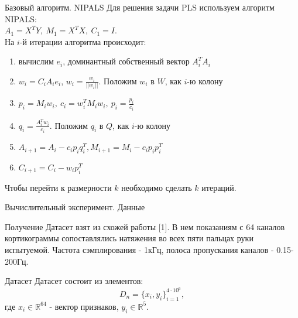 \documentclass{beamer}
\begin{document}
\begin{frame}{Базовый алгоритм. NIPALS}
Для решения задачи PLS используем алгоритм NIPALS:\\
$A_1 = X^TY,\ M_1 = X^TX,\ C_1 = I$.\\ На $i$-й итерации алгоритма происходит:
\begin{enumerate}
    \item вычислим $e_i$, доминантный собственный вектор $A_i^TA_i$
    \item $w_i = C_i A_i e_i$, $w_i = \frac{w_i}{||w_i||}$. Положим $w_i$ в $W$, как $i$-ю колону
    \item $p_i = M_i w_i,\ c_i = w_i^T M_i w_i,\ p_i = \frac{p_i}{c_i}$
    \item $q_i = \frac{A_i^T w_i}{c_i}$. Положим $q_i$ в $Q$, как $i$-ю колону
    \item $A_{i + 1} = A_i - c_i p_i q_i^T, M_{i + 1} = M_i - c_i p_i p^T_i$
    \item $C_{i + 1} = C_i - w_i p_i^T$
\end{enumerate}
 Чтобы перейти к размерности $k$ необходимо сделать $k$ итераций.
\end{frame}
\begin{frame}{Вычислительный эксперимент. Данные}
\begin{block}{Получение}
Датасет взят из схожей работы [1]. В нем показаниям с 64 каналов кортикограммы сопоставлялись натяжения во всех пяти пальцах руки испытуемой. Частота сэмплирования - 1кГц, полоса пропускания каналов - 0.15-200Гц.
\end{block}
\begin{block}{Датасет}
Датасет состоит из элементов:
$$D_n = \{x_i, y_i\}^{4\cdot10^6}_{i=1},$$
где $x_i \in \mathbb{R}^{64}$ - вектор признаков, $y_i \in \mathbb{R}^5$.\\
\end{block}
\end{frame}
\end{document}
